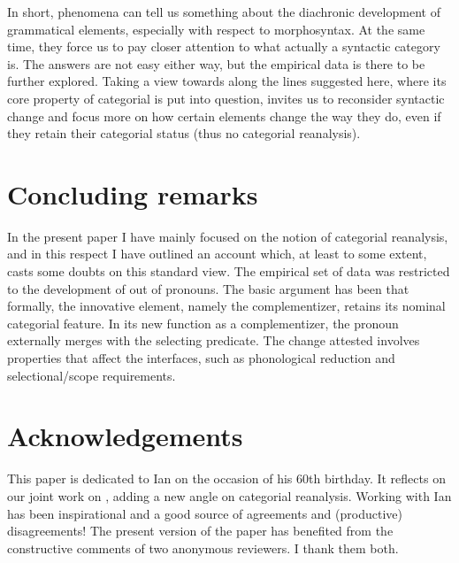 \documentclass[output=paper]{langsci/langscibook}
\begin{document}
\newpage

In short,  phenomena can tell us something about the
diachronic development of grammatical elements, especially with respect to
morphosyntax. At the same time, they force us to pay closer attention to what
actually a syntactic category is. The answers are not easy either way, but the
empirical data is there to be further explored. Taking a view towards
 along the lines suggested here, where its core property of
categorial  is put into question, invites us to reconsider syntactic
change and focus more on how certain elements change the way they do, even if
they retain their categorial status (thus no categorial reanalysis).

\section{Concluding remarks}\label{sec:21-conclusions}

In the present paper I have mainly focused on the notion of categorial
reanalysis, and in this respect I have outlined an account which, at least to
some extent, casts some doubts on this standard view. The empirical set of data
was restricted to the development of  out of pronouns. The
basic argument has been that formally, the innovative element, namely the
complementizer, retains its nominal categorial
feature. In its new function as a complementizer, the
pronoun externally merges with the selecting predicate.  The change attested
involves properties that affect the interfaces, such as phonological reduction
and selectional/scope requirements.

\label{sec:abbreviations}

\printchapterglossary{}

\section*{Acknowledgements}

This paper is dedicated to Ian on the occasion of his 60th birthday. It
reflects on our joint work on , adding a new angle on
categorial reanalysis. Working with Ian has been inspirational and a good
source of agreements and (productive) disagreements! The present version of the
paper has benefited from the constructive comments of two anonymous reviewers.
I thank them both.

{\sloppy
\printbibliography[heading=subbibliography,notkeyword=this]
}
\end{document}
